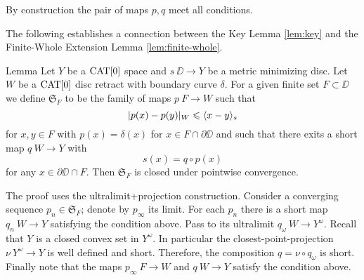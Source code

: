 By construction the pair of maps $p,q$ meet all conditions.
\qeds


The following establishes a connection between the 
Key Lemma \ref{lem:key} and the Finite-Whole Extension Lemma \ref{lem:finite-whole}.

\begin{thm}{Lemma}\label{lem:closed}
Let $Y$ be a $\mathop{\rm CAT}\nolimits[0]$ space and $s\:\DD\to Y$ 
be a metric minimizing disc. Let $W$ be a
$\mathop{\rm CAT}\nolimits[0]$ disc retract with boundary curve $\delta$. For a given 
finite set $F\subset \DD$ we define $\mathfrak{S}_F$ to be the family of maps  
 $p\:F\to W$ such that
\[|p(x)-p(y)|_W\leqslant \langle x-y\rangle_s\] 
for $x,y\in F$ with $p(x)=\delta(x)$ for $x\in F\cap \partial\DD$ and such that there exits
a short map $q\:W\to Y$ with
\[s(x)=q\circ p(x)\] 
for any $x\in\partial\DD\cap F$.
Then $\mathfrak{S}_F$ is closed under pointwise convergence. 
\end{thm}

The proof uses the ultralimit+projection construction.
Consider a converging sequence $p_n\in  \mathfrak{S}_F$;
denote by $p_\infty$ its limit.
For each $p_n$ there is a short map $q_n\:W\to Y$ satisfying the condition above.
Pass to its ultralimit $q_\omega\:W\to Y^\omega$.
Recall that $Y$ is a closed convex set in $Y^\omega$.
In particular the closest-point-projection $\nu\:Y^\omega\to Y$ is well defined and short.
Therefore, the composition $q=\nu\circ q_\omega$ is short.
Finally note that the maps $p_\infty\:F\to W$ and $q\:W\to Y$ satisfy the condition above.
\qeds

